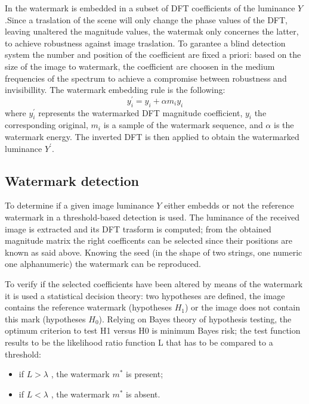 In \cite{PIVA} the watermark is embedded in a subset of DFT coefficients of the luminance $Y$.\newline Since a traslation of the scene will only change the phase values of the DFT, leaving unaltered the magnitude values, the watermak only concernes the latter, to achieve robustness against image traslation.\newline
To garantee a blind detection system the number and position of the coefficient are fixed a priori: based on the size of the image to watermark, the coefficient are choosen in the medium frequencies of the spectrum to achieve a compromise between robustness and invisibillity.\newline 
The watermark embedding rule is the following:
$$y_{i}^{'} = y_{i}+\alpha m_{i}y_{i} $$
where $y_{i}^{'}$ represents the watermarked DFT magnitude coefficient, $y_{i}$ the corresponding original, $m_{i}$ is a sample of the watermark sequence, and $\alpha$ is the watermark energy.\newline
The inverted DFT is then applied to obtain the watermarked luminance $Y^{'}$.

\subsection{Watermark detection}

To determine if a given image luminance $Y$ either embedds or not the reference watermark in \cite{PIVA} a threshold-based detection is used.\newline
The luminance of the received image is extracted and its DFT trasform is computed; from the obtained magnitude matrix the right coefficents can be selected since their positions are known as said above.\newline
Knowing the seed (in the shape of two strings, one numeric one alphanumeric) the watermark can be reproduced.\newline

To verify if the selected coefficients have been altered by means of the watermark it is used a statistical decision theory: two hypotheses are defined, the image contains the reference watermark (hypotheses $H_{1}$) or the image does not contain this mark (hypotheses $H_{0}$). Relying on Bayes theory of hypothesis testing, the optimum criterion to test H1 versus H0 is minimum Bayes risk; the test function results to be the likelihood ratio function L that has to be compared to a threshold:\newline
\begin{itemize}
\item if $L > \lambda$ ,  the watermark $m^{*}$ is present;
\item if $L < \lambda$ , the watermark  $m^{*}$ is absent.
\end{itemize}


